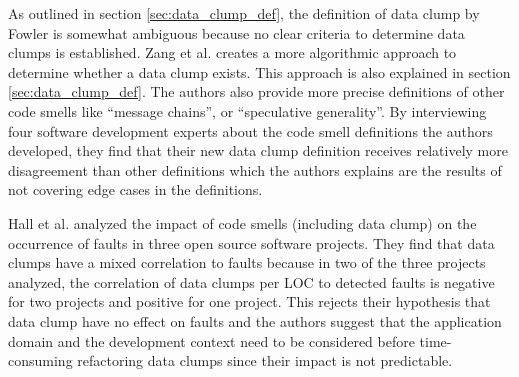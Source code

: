 As outlined in section \ref{sec:data_clump_def}, the definition of data clump by Fowler \cite{fowler2019refactoring} is somewhat ambiguous because no clear criteria to determine data clumps is established. Zang et al. \cite{zhangImprovingPrecisionFowler2008} creates a more algorithmic approach to determine whether a data clump exists. This approach is also explained in section \ref{sec:data_clump_def}. The authors also provide more precise definitions of other code smells  like \enquote{message chains}, or \enquote{speculative generality}. By interviewing four software development experts about the code smell definitions the authors developed, they find that their new data clump definition receives relatively more disagreement than other definitions which the authors explains are the results of not covering edge cases in the definitions. 


Hall et al. analyzed the impact of code smells (including data clump) on the occurrence of faults in three open source software projects. They find that data clumps have a mixed correlation to faults because in two of the three projects analyzed, the correlation of data clumps per \ac{LOC} to detected faults is negative for two projects and  positive for one project. This rejects their hypothesis that data clump have no effect on faults and the authors suggest that the application domain and the development context need to be considered before time-consuming refactoring   data clumps since their impact is not predictable.  \cite{hallCodeSmellsHave2014}